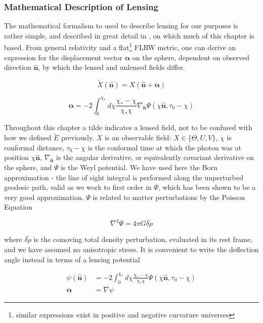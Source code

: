 \documentclass[a4paper,10pt]{article}
\renewcommand{\v}[1]{\mathbf{#1}}
\newcommand{\unit}[1]{\hat{\v{#1}}}
\begin{document}
\subsubsection{Mathematical Description of Lensing}

The mathematical formalism to used to describe lensing for our purposes is rather simple, and described in great detail in \cite{lewis}, on which much of this chapter is based. From general relativity and a flat\footnote{similar expressions exist in positive and negative curvature universes} FLRW metric, one can derive an expression for the displacement vector $\v{\alpha}$ on the sphere, dependent on observed direction $\unit{n}$, by which the lensed and unlensed fields differ. 

\begin{equation}
\tilde{X}(\unit{n}) = X(\unit{n}+\v{\alpha})
\end{equation}

\begin{equation}
\v{\alpha} = -2 \int_0^{\chi_*}d\chi \frac{\chi_*-\chi}{\chi_*\chi}\nabla_{\unit{n}}\Psi(\chi\unit{n},\tau_0-\chi)
\end{equation}

Throughout this chapter a tilde indicates a lensed field, not to be confused with how we defined $\tilde{E}$ previously. $X$ is an observable field: $X \in \{ \Theta, U, V\}$, $\chi$ is conformal distance, $\tau_0-\chi$ is the conformal time at which the photon was at position $\chi\unit{n}$, $\nabla_{\unit{n}}$ is the angular derivative, or equivalently covariant derivative on the sphere, and $\Psi$ is the Weyl potential. We have used here the Born approximation - the line of sight integral is performed along the unperturbed geodesic path, valid as we work to first order in $\Psi$, which has been shown to be a very good approximation. $\Psi$ is related to matter perturbations by the Poisson Equation

\begin{equation}
\nabla^2\Psi = 4\pi G\bar{\delta\rho}
\label{poisson}
\end{equation}

where $\bar{\delta\rho}$ is the comoving total density perturbation, evaluated in its rest frame, and we have assumed no anisotropic stress. It is convenient to write the deflection angle instead in terms of a lensing potential

\begin{equation}\begin{split}
\psi(\unit{n}) &= -2 \int_0^{\chi_*}d\chi \frac{\chi_*-\chi}{\chi_*\chi}\Psi(\chi\unit{n},\tau_0-\chi)\\
\v{\alpha} &= \nabla \psi
\end{split}\end{equation}
\end{document}
